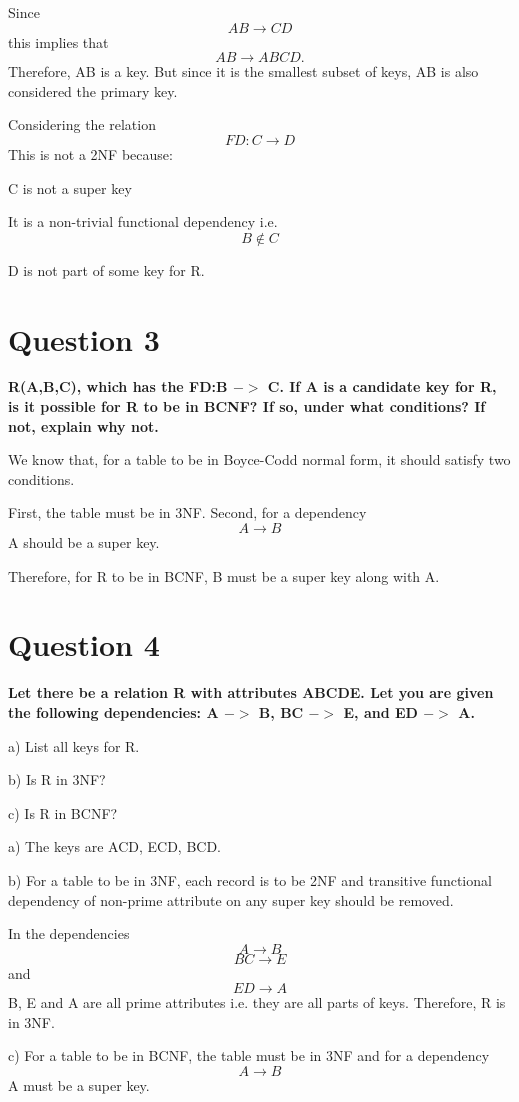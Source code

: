 \documentclass[12pt]{article}
\begin{document}
Since \[AB \rightarrow CD\] this implies that \[AB \rightarrow ABCD.\]
Therefore, AB is a key. But since it is the smallest subset of keys, AB is also considered the primary key. 

Considering the relation \[FD: C \rightarrow D\] 
This is not a 2NF because:

C is not a super key

It is a non-trivial functional dependency i.e. \[B \not\in C\]

D is not part of some key for R.

\section*{Question 3}
{\bfseries R(A,B,C), which has the FD:B $->$ C. If A is a candidate key for R, is it possible for R to be in BCNF? If so, under what conditions? If not, explain why not.}

We know that, for a table to be in Boyce-Codd normal form, it should satisfy two conditions.

First, the table must be in 3NF.
Second, for a dependency \[A \rightarrow B\] A should be a super key.

Therefore, for R to be in BCNF, B must be a super key along with A.

\section*{Question 4}
{\bfseries Let there be a relation R with attributes ABCDE. Let you are given the following dependencies: A $->$ B, BC $->$ E, and ED $->$ A. 

a) List all keys for R. 

b) Is R in 3NF?

c) Is R in BCNF?}

a) The keys are ACD, ECD, BCD.

b) For a table to be in 3NF, each record is to be 2NF and transitive functional dependency of non-prime attribute on any super key should be removed.

In the dependencies \[A \rightarrow B\] \[BC \rightarrow E\] and \[ED \rightarrow A\] B, E and A are all prime attributes i.e. they are all parts of keys. Therefore, R is in 3NF.

c) For a table to be in BCNF, the table must be in 3NF and for a dependency \[A \rightarrow B\] A must be a super key.
\end{document}
